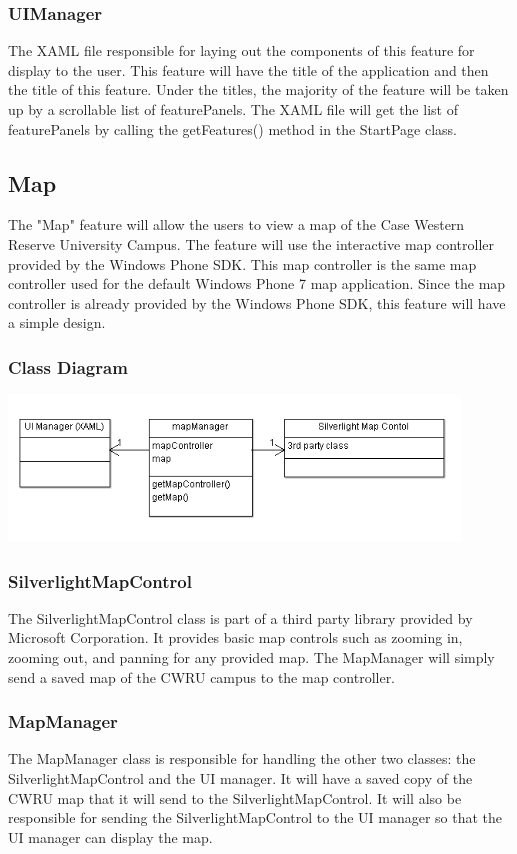 \documentclass[pdftex,12pt,letter]{article}
\begin{document}
\subsubsection{UIManager}
The XAML file responsible for laying out the components of this feature for display to the user. This feature will have the title of the application and then the title of this feature. Under the titles, the majority of the feature will be taken up by a scrollable list of featurePanels. The XAML file will get the list of featurePanels by calling the getFeatures() method in the StartPage class. 
\subsection{Map}
The "Map" feature will allow the users to view a map of the Case Western Reserve University Campus. The feature will use the interactive map controller provided by the Windows Phone SDK. This map controller is the same map controller used for the default Windows Phone 7 map application. Since the map controller is already provided by the Windows Phone SDK, this feature will have a simple design.
\subsubsection{Class Diagram}
\includegraphics[width=120mm]{MapCD.png}
\subsubsection{SilverlightMapControl}
The SilverlightMapControl class is part of a third party library provided by Microsoft Corporation. It provides basic map controls such as zooming in, zooming out, and panning for any provided map. The MapManager will simply send a saved map of the CWRU campus to the map controller.
\subsubsection{MapManager}
The MapManager class is responsible for handling the other two classes: the SilverlightMapControl and the UI manager. It will have a saved copy of the CWRU map that it will send to the SilverlightMapControl. It will also be responsible for sending the SilverlightMapControl to the UI manager so that the UI manager can display the map.
\end{document}
